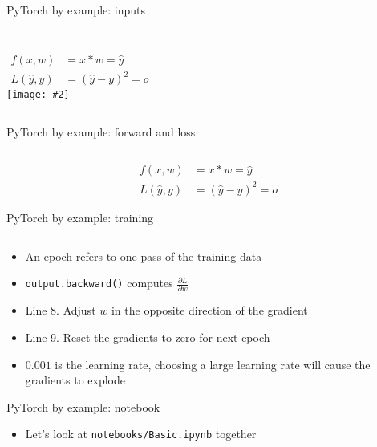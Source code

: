 \documentclass[hyperref={pdfpagelabels=false},12pt]{beamer}
\newcommand{\ig}[2]{\texttt{[image: \#2]}}
\newcommand{\code}[2]{\texttt{#2}}
\newcommand{\pygment}[3]{\inputminted[bgcolor=lightgray,linenos,fontsize=#1]{#2}{#3}}
\begin{document}
\begin{frame}{PyTorch by example: inputs}
  \centering
  \pygment{\scriptsize}{python}{code/basic-training.0.py}
  \vspace{-0.75cm}
  \begin{columns}
      \vspace{-2cm}
      \begin{align*}
        f(x, w) &= x * w = \hat{y} \\
        L(\hat{y}, y) &= (\hat{y} - y)^2 = o
      \end{align*}
      \ig{1.0}{figures/2x.png}
  \end{columns}
\end{frame}

\begin{frame}{PyTorch by example: forward and loss}
  \pygment{\scriptsize}{python}{code/basic-training.1.py}
  \begin{align*}
    f(x, w) &= x * w = \hat{y} \\
    L(\hat{y}, y) &= (\hat{y} - y)^2 = o
  \end{align*}
\end{frame}

\begin{frame}{PyTorch by example: training}
  \pygment{\scriptsize}{python}{code/basic-training.2.py}
  \vspace{-0.5cm}
  \begin{itemize}
      \item An epoch refers to one pass of the training data
      \item \code{python}{output.backward()} computes $\frac{\partial L}{\partial w}$
      \item Line 8. Adjust $w$ in the opposite direction of the gradient
      \item Line 9. Reset the gradients to zero for next epoch
      \item $0.001$ is the learning rate, choosing a large learning rate will cause
        the gradients to explode
  \end{itemize}
\end{frame}

\begin{frame}{PyTorch by example: notebook}
  \begin{itemize}
    \item Let's look at \texttt{notebooks/Basic.ipynb} together
  \end{itemize}
\end{frame}
\end{document}
